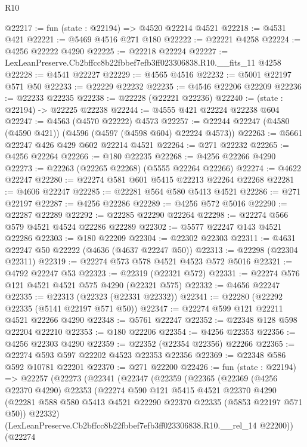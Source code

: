 \begin{lexlean}{R10}
\begin{coremodule}
@22217 := fun (state : @22194) => @4520 @22214 @4521
@22218 := @4531 @421
@22221 := @5469 @4516 @271 @180
@22222 := @22221 @4258
@22224 := @4256 @22222 @4290
@22225 := @22218 @22224
@22227 := LexLeanPreserve.Cb2bffcc8b22fbbef7efb3ff023306838.R10.__fits_11 @4258
@22228 := @4541 @22227
@22229 := @4565 @4516
@22232 := @5001 @22197 @571 @50
@22233 := @22229 @22232
@22235 := @4546 @22206 @22209
@22236 := @22233 @22235
@22238 := @22228 (@22221 @22236)
@22240 := (state : @22194) -> @22225 @22238
@22244 := @4555 @421 @22224 @22238 @604
@22247 := @4563 (@4570 @22222) @4573
@22257 := @22244 @22247 (@4580 (@4590 @421)) (@4596 (@4597 (@4598 @604) @22224 @4573))
@22263 := @5661 @22247 @426 @429 @602 @22214 @4521
@22264 := @271 @22232
@22265 := @4256 @22264
@22266 := @180 @22235
@22268 := @4256 @22266 @4290
@22273 := @22263 (@22265 @22268) (@5555 @22264 @22266)
@22274 := @4622 @22247
@22280 := @22274 @581 @601 @5415 @22213 @22264 @22268
@22281 := @4606 @22247
@22285 := @22281 @564 @580 @5413 @4521
@22286 := @271 @22197
@22287 := @4256 @22286
@22289 := @4256 @572 @5016
@22290 := @22287 @22289
@22292 := @22285 @22290 @22264
@22298 := @22274 @566 @579 @4521 @4524 @22286 @22289
@22302 := @5577 @22247 @143 @4521 @22286
@22303 := @180 @22209
@22304 := @22302 @22303
@22311 := @4631 @22247 @50 @22222 (@4636 (@4637 @22247 @50))
@22313 := @22298 (@22304 @22311)
@22319 := @22274 @573 @578 @4521 @4523 @572 @5016
@22321 := @4792 @22247 @53
@22323 := @22319 (@22321 @572)
@22331 := @22274 @576 @121 @4521 @4521 @575 @4290 (@22321 @575)
@22332 := @4656 @22247
@22335 := @22313 (@22323 (@22331 @22332))
@22341 := @22280 (@22292 @22335 (@5141 @22197 @571 @50))
@22347 := @22274 @599 @121 @22211 @4521 @22266 @4290
@22348 := @5761 @22247
@22352 := @22348 @128 @598 @22204 @22210
@22353 := @180 @22206
@22354 := @4256 @22353
@22356 := @4256 @22303 @4290
@22359 := @22352 (@22354 @22356) @22266
@22365 := @22274 @593 @597 @22202 @4523 @22353 @22356
@22369 := @22348 @586 @592 @10781 @22201
@22370 := @271 @22200
@22426 := fun (state : @22194) =>
  @22257
    (@22273
      (@22341
        (@22347
          (@22359
            (@22365
              (@22369
                (@4256 @22370 @4290)
                @22353
                (@22274
                  @590
                  @121
                  @5415
                  @4521
                  @22370
                  @4290
                  (@22281 @588 @580 @5413 @4521 @22290 @22370 @22335 (@5853 @22197 @571 @50))
                  @22332)
                (LexLeanPreserve.Cb2bffcc8b22fbbef7efb3ff023306838.R10.__rel_14 @22200))
              (@22274

\end{coremodule}
\end{lexlean}
